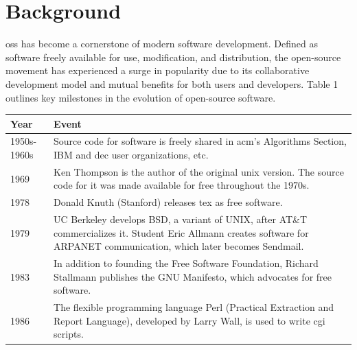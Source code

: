 \section{Background}

\ac{oss} has become a cornerstone of modern software development. Defined as software freely available for use, modification, and distribution, the open-source movement has experienced a surge in popularity due to its collaborative development model and mutual benefits for both users and developers. Table 1 outlines key milestones in the evolution of open-source software.

\begin{center}
    \begin{longtable}{|p{1cm}|p{13cm}|}
        \hline
        \textbf{Year} & \textbf{Event}                                                                                                                                                                                         \\ \hline
        1950s-1960s   & Source code for software is freely shared in \ac{acm}'s Algorithms Section, IBM and \ac{dec} user organizations, etc.                                                                                  \\ \hline
        1969          & Ken Thompson is the author of the original \ac{unix} version. The source code for it was made available for free throughout the 1970s.                                                                 \\ \hline
        1978          & Donald Knuth (Stanford) releases \ac{tex} as free software.                                                                                                                                            \\ \hline
        1979          & UC Berkeley develops BSD, a variant of UNIX, after AT\&T commercializes it. Student Eric Allmann creates software for ARPANET communication, which later becomes Sendmail.                             \\ \hline
        1983          & In addition to founding the Free Software Foundation, Richard Stallmann publishes the GNU Manifesto, which advocates for free software.                                                                \\ \hline
        1986          & The flexible programming language Perl (Practical Extraction and Report Language), developed by Larry Wall, is used to write \ac{cgi} scripts.                                                         \\ \hline

\end{longtable}
\end{center}
